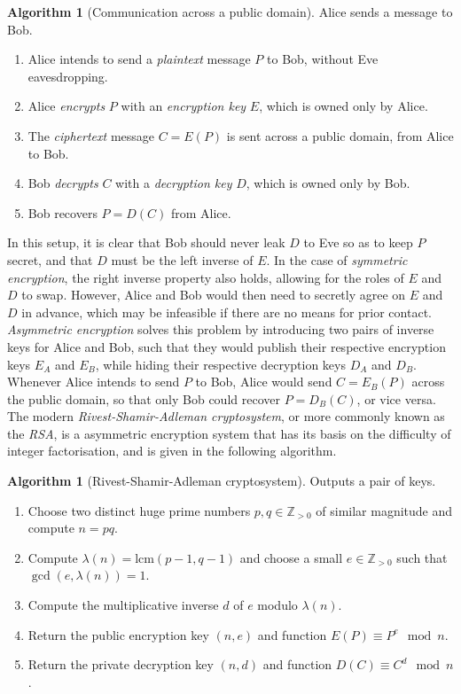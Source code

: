 \documentclass{article}
\newcommand{\Z}{\mathbb{Z}}
\newcommand{\rb}[1]{\left( #1 \right)}
\theoremstyle{definition}
\newtheorem{algorithm}[proposition]{Algorithm}
\begin{document}
\begin{algorithm}[Communication across a public domain]
Alice sends a message to Bob.
\begin{enumerate}
\item Alice intends to send a \emph{plaintext} message $ P $ to Bob, without Eve eavesdropping.
\item Alice \emph{encrypts} $ P $ with an \emph{encryption key} $ E $, which is owned only by Alice.
\item The \emph{ciphertext} message $ C = E\rb{P} $ is sent across a public domain, from Alice to Bob.
\item Bob \emph{decrypts} $ C $ with a \emph{decryption key} $ D $, which is owned only by Bob.
\item Bob recovers $ P = D\rb{C} $ from Alice.
\end{enumerate}
\end{algorithm}

In this setup, it is clear that Bob should never leak $ D $ to Eve so as to keep $ P $ secret, and that $ D $ must be the left inverse of $ E $. In the case of \emph{symmetric encryption}, the right inverse property also holds, allowing for the roles of $ E $ and $ D $ to swap. However, Alice and Bob would then need to secretly agree on $ E $ and $ D $ in advance, which may be infeasible if there are no means for prior contact. \emph{Asymmetric encryption} solves this problem by introducing two pairs of inverse keys for Alice and Bob, such that they would publish their respective encryption keys $ E_A $ and $ E_B $, while hiding their respective decryption keys $ D_A $ and $ D_B $. Whenever Alice intends to send $ P $ to Bob, Alice would send $ C = E_B\rb{P} $ across the public domain, so that only Bob could recover $ P = D_B\rb{C} $, or vice versa. The modern \emph{Rivest-Shamir-Adleman cryptosystem}, or more commonly known as the \emph{RSA}, is a asymmetric encryption system that has its basis on the difficulty of integer factorisation, and is given in the following algorithm.

\begin{algorithm}[Rivest-Shamir-Adleman cryptosystem]
Outputs a pair of keys.
\begin{enumerate}
\item Choose two distinct huge prime numbers $ p, q \in \Z_{> 0} $ of similar magnitude and compute $ n = pq $.
\item Compute $ \lambda\rb{n} = \text{lcm}\rb{p - 1, q - 1} $ and choose a small $ e \in \Z_{> 0} $ such that $ \gcd\rb{e, \lambda\rb{n}} = 1 $.
\item Compute the multiplicative inverse $ d $ of $ e $ modulo $ \lambda\rb{n} $.
\item Return the public encryption key $ \rb{n, e} $ and function $ E\rb{P} \equiv P^e \mod n $.
\item Return the private decryption key $ \rb{n, d} $ and function $ D\rb{C} \equiv C^d \mod n $.
\end{enumerate}
\end{algorithm}
\end{document}
